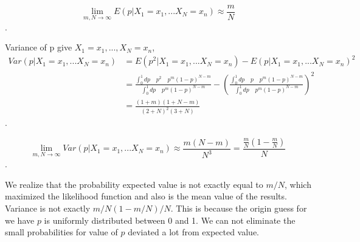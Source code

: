 \begin{equation}
\lim_{m,N \rightarrow \infty} E(p|X_1=x_1, ... X_N=x_n) 
\approx \frac{m}{N}
\label{a9}
\end{equation}.

Variance of p give ${X_1=x_1, ..., X_N=x_n}$,
\begin{align}
Var(p|X_1=x_1, ... X_N=x_n)& =E(p^2|X_1=x_1, ... X_N=x_n)-E(p|X_1=x_1, ... X_N=x_n)^2 \nonumber\\
& =\frac{\int_0^1 dp\quad p^2\quad p^m(1-p)^{N-m}}{\int_0^1 dp\quad p^m(1-p)^{N-m}} \nonumber
-(\frac{\int_0^1 dp\quad p\quad p^m(1-p)^{N-m}}{\int_0^1 dp\quad p^m(1-p)^{N-m}})^2 \nonumber\\
&=\frac{(1+m)(1+N-m)}{(2+N)^2(3+N)}
\label{a10}
\end{align}.

\begin{equation}
\lim_{m,N \rightarrow \infty} Var(p|X_1=x_1, ... X_N=x_n) 
\approx \frac{m(N-m)}{N^3} = \frac{\frac{m}{N}(1-\frac{m}{N}
)}{N}
\label{a11}
\end{equation}.

We realize that the probability expected value is not exactly equal to $m/N$, which maximized the likelihood function and also is the mean value of the results. Variance is not exactly $m/N(1-m/N)/N$. This is because the origin guess for we have $p$ is uniformly distributed between 0 and 1. We can not eliminate the small probabilities for value of $p$ deviated a lot from expected value. 